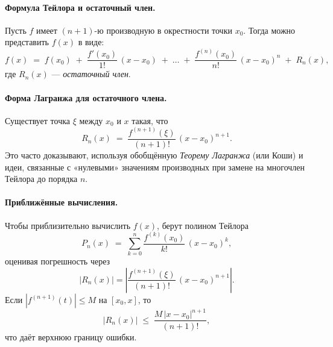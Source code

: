 
\paragraph{Формула Тейлора и остаточный член.}
Пусть $f$ имеет $(n+1)$-ю производную в окрестности точки $x_0$.
Тогда можно представить $f(x)$ в виде:
\[
	f(x)
	\;=\;
	f(x_0)
	\;+\;
	\frac{f'(x_0)}{1!}\,(x - x_0)
	\;+\;\dots\;+\;
	\frac{f^{(n)}(x_0)}{n!}\,(x - x_0)^n
	\;+\;
	R_n(x),
\]
где $R_n(x)$ — \emph{остаточный член}.

\bigskip

\paragraph{Форма Лагранжа для остаточного члена.}
Существует точка $\xi$ между $x_0$ и $x$ такая, что
\[
	R_n(x)
	\;=\;
	\frac{f^{(n+1)}(\xi)}{(n+1)!}\,(x - x_0)^{n+1}.
\]
Это часто доказывают, используя обобщённую \emph{Теорему Лагранжа} (или Коши) и идеи, связанные с «нулевыми» значениям производных при замене на многочлен Тейлора до порядка $n$.

\bigskip

\paragraph{Приближённые вычисления.}
Чтобы приблизительно вычислить $f(x)$, берут полином Тейлора
\[
	P_n(x)
	\;=\;
	\sum_{k=0}^n
	\frac{f^{(k)}(x_0)}{k!}\,(x - x_0)^k,
\]
оценивая погрешность через
\[
	|R_n(x)|
	= \left|
	\frac{f^{(n+1)}(\xi)}{(n+1)!}\,(x - x_0)^{n+1}
	\right|.
\]
Если $|f^{(n+1)}(t)| \le M$ на $[x_0,x]$, то
\[
	|R_n(x)|
	\;\le\;
	\frac{M\,|x-x_0|^{n+1}}{(n+1)!},
\]
что даёт верхнюю границу ошибки.
